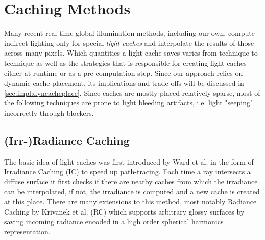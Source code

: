 \documentclass[thesis.tex]{subfiles}
\begin{document}
\section{Caching Methods}
Many recent real-time global illumination methods, including our own, compute indirect lighting only for special \emph{light caches} and interpolate the results of those across many pixels.
Which quantities a light cache saves varies from technique to technique as well as the strategies that is responsible for creating light caches either at runtime or as a pre-computation step.
Since our approach relies on dynamic cache placement, its implications and trade-offs will be discussed in \autoref{sec:impl:dyncacheplace}.
Since caches are mostly placed relatively sparse, most of the following techniques are prone to light bleeding artifacts, i.e. light "seeping" incorrectly through blockers.

\subsection{(Irr-)Radiance Caching}
The basic idea of light caches was first introduced by Ward et al. \cite{bib:irradiancecaching} in the form of Irradiance Caching (IC) to speed up path-tracing.
Each time a ray intersects a diffuse surface it first checks if there are nearby caches from which the irradiance can be interpolated, if not, the irradiance is computed and a new cache is created at this place.
There are many extensions to this method, most notably Radiance Caching by Krivanek et al. \cite{bib:radiancecaching} (RC) which supports arbitrary glossy surfaces by saving incoming radiance encoded in a high order spherical harmonics representation.
\end{document}
